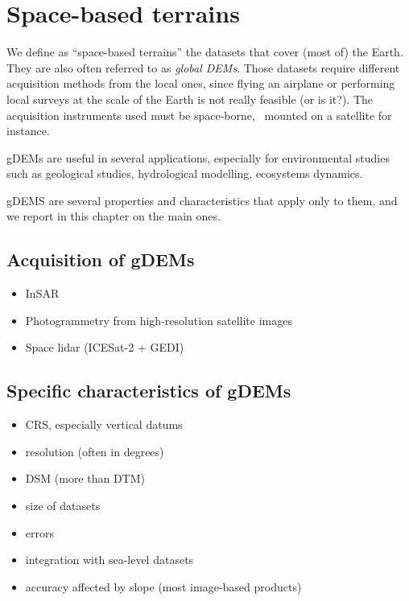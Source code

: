 
\setchapterpreamble[u]{\margintoc}
\graphicspath{{spacedem/}}


\chapter{Space-based terrains}%
\label{chap:spacedem}

We define as ``space-based terrains'' the datasets that cover (most of) the Earth.
They are also often referred to as \emph{global DEMs}.
Those datasets require different acquisition methods from the local ones, since flying an airplane or performing local surveys at the scale of the Earth is not really feasible (or is it?).
The acquisition instruments used must be space-borne, \ie\ mounted on a satellite for instance.


gDEMs are useful in several applications, especially for environmental studies such as geological studies, hydrological modelling, ecosystems dynamics.

gDEMS are several properties and characteristics that apply only to them, and we report in this chapter on the main ones.


%
\section{Acquisition of gDEMs}

\begin{itemize}
  \item InSAR
  \item Photogrammetry from high-resolution satellite images
  \item Space lidar (ICESat-2 + GEDI)
\end{itemize}


%
\section[Specific characteristics]{Specific characteristics of gDEMs}

\begin{itemize}
  \item CRS, especially vertical datums
  \item resolution (often in degrees)
  \item DSM (more than DTM)
  \item size of datasets
  \item errors
  \item integration with sea-level datasets
  \item accuracy affected by slope (most image-based products)
\end{itemize}


